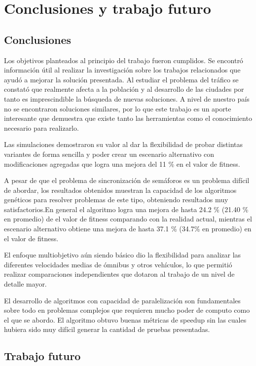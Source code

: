 \chapter{Conclusiones y trabajo futuro}

\section{Conclusiones}
Los objetivos planteados al principio del trabajo fueron cumplidos.
Se encontró información útil al realizar la investigación sobre los trabajos relacionados que ayudó a mejorar la solución presentada. 
Al estudiar el problema del tráfico se constató que realmente afecta a la población y al desarrollo de las ciudades por tanto es imprescindible la búsqueda de nuevas soluciones. A nivel de nuestro país no se encontraron soluciones similares, por lo que este trabajo es un aporte interesante que demuestra que existe tanto las herramientas como el conocimiento necesario para realizarlo.
 
Las simulaciones demostraron su valor al dar la flexibilidad de probar distintas variantes de forma sencilla y poder crear un escenario alternativo con modificaciones agregadas que logra una mejora del 11 \% en el valor de fitness.
 
A pesar de que el problema de sincronización de semáforos es un problema difícil de abordar, los resultados obtenidos muestran la capacidad de los algoritmos genéticos para resolver problemas de este tipo, obteniendo resultados muy  satisfactorios.En general el algoritmo logra una mejora de hasta  24.2 \% (21.40 \% en promedio) de el valor de fitness comparando con la realidad actual, mientras el escenario alternativo obtiene una mejora de hasta 37.1 \% (34.7\% en promedio) en el valor de fitness.

El enfoque multiobjetivo aún siendo básico dio la flexibilidad para analizar las diferentes velocidades medias de ómnibus y otros vehículos, lo que permitió realizar comparaciones independientes que dotaron al trabajo de un nivel de detalle mayor.

El desarrollo de algoritmos con capacidad de paralelización son fundamentales sobre  todo en problemas complejos que requieren mucho poder de computo como el que se abordo. El algoritmo obtuvo buenas métricas de speedup sin las cuales hubiera sido muy difícil generar la cantidad de pruebas presentadas.

\section{Trabajo futuro}

